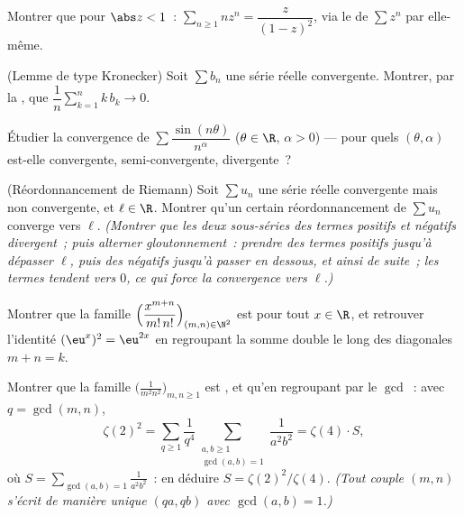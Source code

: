 \begin{exercise}[$\star$]\label{exo:b2:series:2}
Montrer que pour $\abs z < 1$~: $\sum_{n\geq1} n z^{n} =
\dfrac{z}{(1-z)^2}$, via le  de $\sum z^n$ par
elle-même.
\end{exercise}

\begin{exercise}[$\star\star$]\label{exo:b2:series:3}
(Lemme de type Kronecker) Soit $\sum b_n$ une série réelle
convergente. Montrer, par la , que
$\dfrac{1}{n}\sum_{k=1}^{n} k\,b_k \to 0$.
\end{exercise}

\begin{exercise}[$\star\star$]\label{exo:b2:series:4}
Étudier la convergence de $\sum \dfrac{\sin(n\theta)}{n^\alpha}$
($\theta \in \R$, $\alpha > 0$) --- pour quels $(\theta, \alpha)$
est-elle  convergente, semi-convergente, divergente~?
\end{exercise}

\begin{exercise}[$\star\star\star$]\label{exo:b2:series:5}
(Réordonnancement de Riemann) Soit $\sum u_n$ une série réelle
convergente mais non  convergente, et $\ell \in \R$.
Montrer qu'un certain réordonnancement de $\sum u_n$ converge vers
$\ell$. \emph{(Montrer que les deux sous-séries des termes positifs
et négatifs divergent~; puis alterner gloutonnement~: prendre des
termes positifs jusqu'à dépasser $\ell$, puis des négatifs jusqu'à
passer en dessous, et ainsi de suite~; les termes tendent vers $0$,
ce qui force la convergence vers $\ell$.)}
\end{exercise}

\begin{exercise}[$\star\star$]\label{exo:b2:series:6}
Montrer que la famille
$\Bigl(\dfrac{x^{m+n}}{m!\,n!}\Bigr)_{(m,n)\in\N^2}$ est 
pour tout $x \in \R$, et retrouver l'identité $(\eu^x)^2 = \eu^{2x}$
en regroupant la somme double le long des diagonales $m + n = k$.
\end{exercise}

\begin{exercise}[$\star\star$]\label{exo:b2:series:7}
Montrer que la famille $\bigl(\frac{1}{m^2 n^2}\bigr)_{m,n \geq 1}$
est , et qu'en regroupant par le $\gcd$~: avec $q =
\gcd(m,n)$,
\[
\zeta(2)^2 = \sum_{q\geq1} \frac{1}{q^4}
\sum_{\substack{a,b \geq 1\\ \gcd(a,b)=1}} \frac{1}{a^2b^2}
= \zeta(4) \cdot S,
\]
où $S = \sum_{\gcd(a,b)=1} \frac{1}{a^2b^2}$~: en déduire $S =
\zeta(2)^2/\zeta(4)$. \emph{(Tout couple $(m,n)$ s'écrit de manière
unique $(qa, qb)$ avec $\gcd(a,b) = 1$.)}
\end{exercise}

